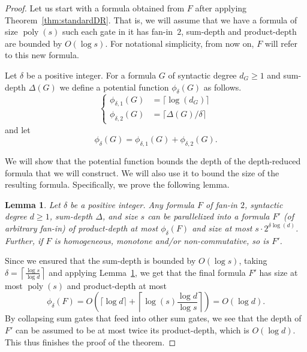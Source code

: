 \documentclass[10pt,a4paper]{article}
\newtheorem{lemma}[theorem]{Lemma}
\newcommand{\poly}{\mathop{\mathrm{poly}}}
\begin{document}
\begin{proof}
	Let us start with a formula obtained from $F$ after applying Theorem~\ref{thm:standardDR}. That is, we will assume that we have a formula of size $\poly(s)$ such each gate in it has fan-in~$2$, sum-depth and product-depth are bounded by $O(\log s)$. For notational simplicity, from now on, $F$ will refer to this new formula.
	
	
	
	
	Let \(\delta\) be a positive integer. For a formula $G$ of syntactic degree $d_G \geq 1$ and sum-depth $\Delta(G)$ we define a potential function $\phi_\delta(G)$ as follows.
	\begin{equation*}
		\left\{\begin{aligned}
			\phi_{\delta,1} (G) & = \lceil \log(d_G) \rceil \\
			\phi_{\delta,2} (G) & =  \lceil \Delta(G) / \delta \rceil
		\end{aligned}\right.
	\end{equation*}
	and let $$\phi_{\delta}(G)= \phi_{\delta,1} (G) + \phi_{\delta,2} (G).$$
	
	We will show that the potential function bounds the depth of the depth-reduced formula that we will construct. We will also use it to bound the size of the resulting formula. Specifically, we prove the following lemma. 
	
	\begin{lemma}
		\label{lem:main-lemma}
		Let \(\delta\) be a positive integer.
		Any formula $F$ of fan-in \(2\), syntactic degree $d \geq 1$, sum-depth $\Delta$, and size \(s\) can be parallelized into a formula $F'$ (of arbitrary fan-in) of product-depth at most \(\phi_{\delta}(F)\)  and size at most
		\(s\cdot 2^{\delta \log(d)}\).
		Further, if $F$ is homogeneous, monotone and/or non-commutative, so is $F'$.
	\end{lemma}
	
	Since we ensured that the sum-depth is bounded by \(O(\log s)\), taking
	\(\delta=\left\lceil \frac{\log s}{\log d} \right\rceil \)
	and applying Lemma~\ref{lem:main-lemma}, we get that the final formula $F'$ has size at most \(\poly(s)\) and product-depth at most 
	\[
	\phi_{\delta}(F) = O\left( \lceil \log d \rceil+ \left\lceil \log(s) \frac{\log d}{\log s} \right\rceil \right) =  O(\log d).
	\]
	By collapsing sum gates that feed into other sum gates, we see that the depth of $F'$ can be assumed to be at most twice its product-depth, which is $O(\log d)$. This thus finishes the proof of the theorem. \end{proof}
\end{document}
